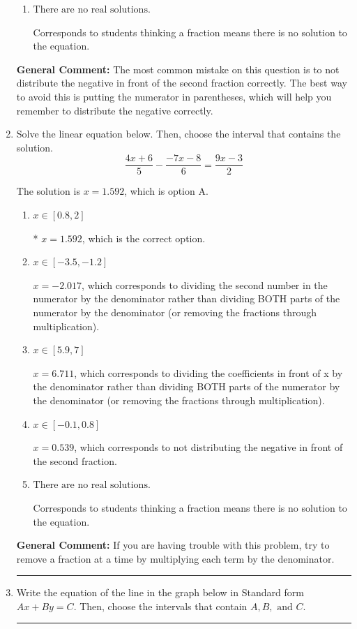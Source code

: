 \documentclass{extbook}[14pt]
\newcommand{\litem}[1]{\item #1

\rule{\textwidth}{0.4pt}}
\begin{document}
\begin{enumerate}
{\begin{enumerate}[label=\Alph*.]
$x = -0.661$, which corresponds to getting the negative of the actual solution.
\item \( \text{There are no real solutions.} \)

Corresponds to students thinking a fraction means there is no solution to the equation.
\end{enumerate}

\textbf{General Comment:} The most common mistake on this question is to not distribute the negative in front of the second fraction correctly. The best way to avoid this is putting the numerator in parentheses, which will help you remember to distribute the negative correctly.
}
\litem{
Solve the linear equation below. Then, choose the interval that contains the solution.
\[ \frac{4x + 6}{5} - \frac{-7x -8}{6} = \frac{9x -3}{2} \]

The solution is \( x = 1.592 \), which is option A.\begin{enumerate}[label=\Alph*.]
\item \( x \in [0.8, 2] \)

* $x = 1.592$, which is the correct option.
\item \( x \in [-3.5, -1.2] \)

 $x = -2.017$, which corresponds to dividing the second number in the numerator by the denominator rather than dividing BOTH parts of the numerator by the denominator (or removing the fractions through multiplication).
\item \( x \in [5.9, 7] \)

 $x = 6.711$, which corresponds to dividing the coefficients in front of x by the denominator rather than dividing BOTH parts of the numerator by the denominator (or removing the fractions through multiplication).
\item \( x \in [-0.1, 0.8] \)

 $x = 0.539$, which corresponds to not distributing the negative in front of the second fraction.
\item \( \text{There are no real solutions.} \)

Corresponds to students thinking a fraction means there is no solution to the equation.
\end{enumerate}

\textbf{General Comment:} If you are having trouble with this problem, try to remove a fraction at a time by multiplying each term by the denominator.
}
\litem{
Write the equation of the line in the graph below in Standard form $Ax+By=C$. Then, choose the intervals that contain $A, B, \text{ and } C$.

}
\end{enumerate}
\end{document}
